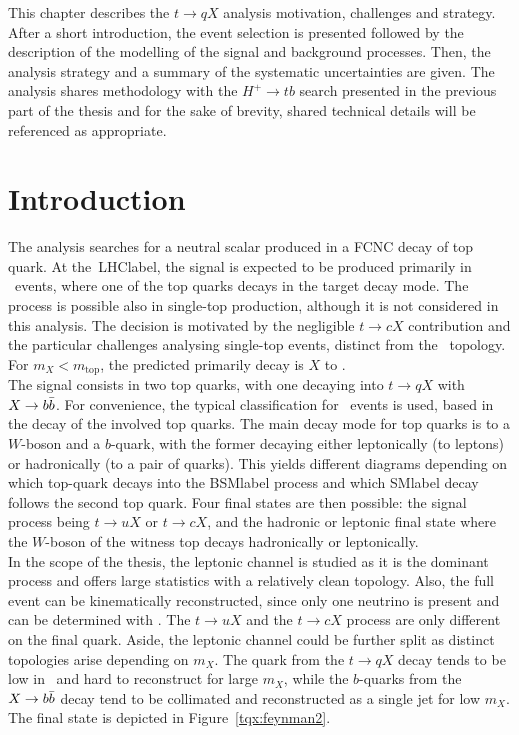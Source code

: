 This chapter describes the $t\to qX$ analysis motivation, challenges and strategy. After a short introduction, the event selection is presented followed by the description of the modelling of the signal and background processes. Then, the analysis strategy and a summary of the systematic uncertainties are given. The analysis shares methodology with the $H^+\to tb$ search presented in the previous part of the thesis and for the sake of brevity, shared technical details will be referenced as appropriate.

\section{Introduction}

The analysis searches for a neutral scalar produced in a FCNC decay of top quark. At the~\acrshort{LHClabel}, the signal is expected to be produced primarily in \ttbar\ events, where one of the top quarks decays in the target decay mode. The process is possible also in single-top production, although it is not considered in this analysis. The decision is motivated by the negligible $t\to cX$ contribution and the particular challenges analysing single-top events, distinct from the \ttbar\ topology. For $m_X<m_\text{top}$, the predicted primarily decay is $X$ to \bbar.\\

The signal consists in two top quarks, with one decaying into $t\to qX$ with $X\to b\bar{b}$. For convenience, the typical classification for \ttbar\ events is used, based in the decay of the involved top quarks. The main decay mode for top quarks is to a $W$-boson and a $b$-quark, with the former decaying either leptonically (to leptons) or hadronically (to a pair of quarks). This yields different diagrams depending on which top-quark decays into the \acrshort{BSMlabel} process and which \acrshort{SMlabel} decay follows the second top quark. Four final states are then possible: the signal process being $t\to uX$ or $t\to cX$, and the hadronic or leptonic final state where the $W$-boson of the witness top decays hadronically or leptonically.\\

In the scope of the thesis, the leptonic channel is studied as it is the dominant process and offers large statistics with a relatively clean topology. Also, the full event can be kinematically reconstructed, since only one neutrino is present and can be determined with \MET. The $t\to uX$ and the $t\to cX$ process are only different on the final quark. Aside, the leptonic channel could be further split as distinct topologies arise depending on $m_X$. The quark from the $t\to qX$ decay tends to be low in \pT\ and hard to reconstruct for large $m_X$, while the $b$-quarks from the $X\to b\bar{b}$ decay tend to be collimated and reconstructed as a single jet for low $m_X$. The final state is depicted in Figure~\ref{tqx:feynman2}.\\


